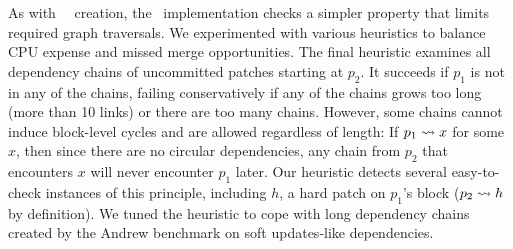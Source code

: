 As with \nrb\ \patch\ creation, the \Kudos\ implementation checks a simpler
property that limits required graph traversals.
%
We experimented with various heuristics to balance CPU expense and missed
merge opportunities.
%
The final heuristic examines all dependency chains of uncommitted patches
starting at $p_2$.  It succeeds if $p_1$ is not in any of the chains,
failing conservatively if any of the chains grows too long (more than 10
links) or there are too many chains.  
%
However, some chains cannot induce block-level cycles and are allowed
regardless of length:
%
If $p_1 \leadsto x$ for some $x$, then
%
since there are no circular dependencies, any chain from $p_2$ that
encounters $x$ will never encounter $p_1$ later.  Our heuristic detects
several easy-to-check instances of this principle, including $h$, a
hard patch on $p_1$'s block ($p_2 \leadsto h$ by definition).
%
We tuned the heuristic to cope with
long dependency chains created by the Andrew benchmark on soft updates-like
dependencies.
%
